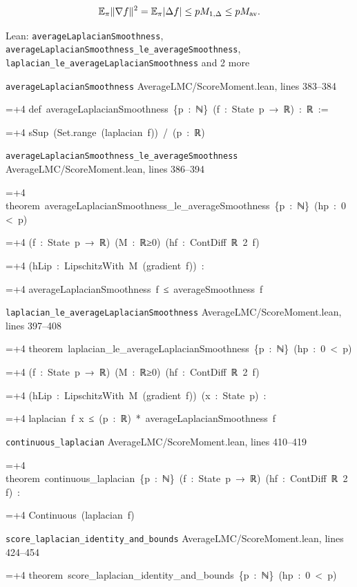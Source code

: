 \documentclass[11pt,a4paper]{article}
\newlength{\leancharwidth}
\newenvironment{leancode}{\par\smallskip\begingroup\ttfamily\footnotesize\raggedright
  \settowidth{\leancharwidth}{M}\setlength{\parskip}{0pt}\setlength{\parindent}{0pt}
  \frenchspacing}{\par\endgroup\smallskip}
\newcommand{\leanline}[2]{\hangindent=\dimexpr#1\leancharwidth+4\leancharwidth\relax
  \hangafter=1\noindent\hspace*{#1\leancharwidth}#2\par}
\newcommand{\leansource}[1]{\par{\footnotesize\color{leanmuted}#1}\par}
\begin{document}
\[\mathbb E_\pi\|\nabla f\|^2=\mathbb E_\pi|\Delta f|\le pM_{1,\Delta}\le pM_{\rm av}.\]\begin{leanbox}{Lean: \texttt{averageLaplacianSmoothness}, \texttt{averageLaplacianSmoothness\_\allowbreak{}le\_\allowbreak{}averageSmoothness}, \texttt{laplacian\_\allowbreak{}le\_\allowbreak{}averageLaplacianSmoothness} and 2 more}
\leansource{\texttt{averageLaplacianSmoothness} \quad AverageLMC/\allowbreak{}ScoreMoment.lean, lines 383–384}
\begin{leancode}
\leanline{0}{def\ averageLaplacianSmoothness\ \{p\ :\ ℕ\}\ (f\ :\ State\ p\ →\ ℝ)\ :\ ℝ\ :=}
\leanline{2}{sSup\ (Set.range\ (laplacian\ f))\ /\ (p\ :\ ℝ)}
\end{leancode}
\leansource{\texttt{averageLaplacianSmoothness\_\allowbreak{}le\_\allowbreak{}averageSmoothness} \quad AverageLMC/\allowbreak{}ScoreMoment.lean, lines 386–394}
\begin{leancode}
\leanline{0}{theorem\ averageLaplacianSmoothness\_le\_averageSmoothness\ \{p\ :\ ℕ\}\ (hp\ :\ 0\ <\ p)}
\leanline{4}{(f\ :\ State\ p\ →\ ℝ)\ (M\ :\ ℝ≥0)\ (hf\ :\ ContDiff\ ℝ\ 2\ f)}
\leanline{4}{(hLip\ :\ LipschitzWith\ M\ (gradient\ f))\ :}
\leanline{4}{averageLaplacianSmoothness\ f\ ≤\ averageSmoothness\ f}
\end{leancode}
\leansource{\texttt{laplacian\_\allowbreak{}le\_\allowbreak{}averageLaplacianSmoothness} \quad AverageLMC/\allowbreak{}ScoreMoment.lean, lines 397–408}
\begin{leancode}
\leanline{0}{theorem\ laplacian\_le\_averageLaplacianSmoothness\ \{p\ :\ ℕ\}\ (hp\ :\ 0\ <\ p)}
\leanline{4}{(f\ :\ State\ p\ →\ ℝ)\ (M\ :\ ℝ≥0)\ (hf\ :\ ContDiff\ ℝ\ 2\ f)}
\leanline{4}{(hLip\ :\ LipschitzWith\ M\ (gradient\ f))\ (x\ :\ State\ p)\ :}
\leanline{4}{laplacian\ f\ x\ ≤\ (p\ :\ ℝ)\ *\ averageLaplacianSmoothness\ f}
\end{leancode}
\leansource{\texttt{continuous\_\allowbreak{}laplacian} \quad AverageLMC/\allowbreak{}ScoreMoment.lean, lines 410–419}
\begin{leancode}
\leanline{0}{theorem\ continuous\_laplacian\ \{p\ :\ ℕ\}\ (f\ :\ State\ p\ →\ ℝ)\ (hf\ :\ ContDiff\ ℝ\ 2\ f)\ :}
\leanline{4}{Continuous\ (laplacian\ f)}
\end{leancode}
\leansource{\texttt{score\_\allowbreak{}laplacian\_\allowbreak{}identity\_\allowbreak{}and\_\allowbreak{}bounds} \quad AverageLMC/\allowbreak{}ScoreMoment.lean, lines 424–454}
\begin{leancode}
\leanline{0}{theorem\ score\_laplacian\_identity\_and\_bounds\ \{p\ :\ ℕ\}\ (hp\ :\ 0\ <\ p)}

\end{leancode}
\end{leanbox}
\end{document}
